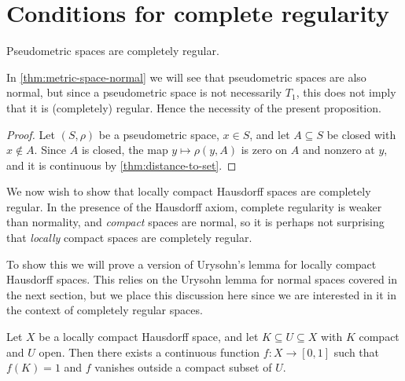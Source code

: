 \documentclass[article, a4paper, 11pt, oneside]{memoir}
\numberwithin{equation}{chapter}
\begin{document}
    


\section{Conditions for complete regularity}

\begin{proposition}
    \label{thm:pseudometric-completely-regular}
    Pseudometric spaces are completely regular.
\end{proposition}
%
In \cref{thm:metric-space-normal} we will see that pseudometric spaces are also normal, but since a pseudometric space is not necessarily $T_1$, this does not imply that it is (completely) regular. Hence the necessity of the present proposition.

\begin{proof}
    Let $(S,\rho)$ be a pseudometric space, $x \in S$, and let $A \subseteq S$ be closed with $x \not\in A$. Since $A$ is closed, the map $y \mapsto \rho(y,A)$ is zero on $A$ and nonzero at $y$, and it is continuous by \cref{thm:distance-to-set}.
\end{proof}


We now wish to show that locally compact Hausdorff spaces are completely regular. In the presence of the Hausdorff axiom, complete regularity is weaker than normality, and \emph{compact} spaces are normal, so it is perhaps not surprising that \emph{locally} compact spaces are completely regular.

To show this we will prove a version of Urysohn's lemma for locally compact Hausdorff spaces. This relies on the Urysohn lemma for normal spaces covered in the next section, but we place this discussion here since we are interested in it in the context of completely regular spaces.


\begin{theorem}
    \label{thm:Urysohn-LCH}
    Let $X$ be a locally compact Hausdorff space, and let $K \subseteq U \subseteq X$ with $K$ compact and $U$ open. Then there exists a continuous function $f \colon X \to [0,1]$ such that $f(K) = 1$ and $f$ vanishes outside a compact subset of $U$.
\end{theorem}
\end{document}
